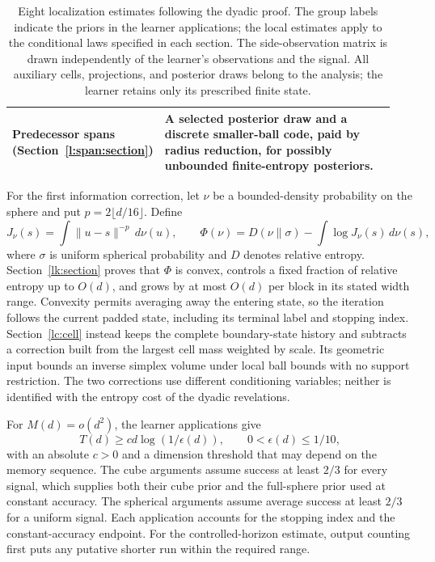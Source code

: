 \begin{table}[!ht]
\begin{tabular}{@{}p{0.28\linewidth}p{0.66\linewidth}@{}}
\addlinespace
\raggedright Predecessor spans\newline
(Section~\ref{l:span:section}) &
A selected posterior draw and a discrete smaller-ball code, paid by
radius reduction, for possibly unbounded finite-entropy posteriors. \\
\bottomrule
\end{tabular}
\caption{Eight localization estimates following the dyadic proof.
The group labels indicate the priors in the learner applications;
the local estimates apply to the conditional laws specified in each
section. The side-observation matrix is drawn independently of the
learner's observations and the signal. All auxiliary cells,
projections, and posterior draws belong to the analysis;
the learner retains only its prescribed finite state.}
\label{l:routes}
\end{table}

For the first information correction, let \(\nu\) be a bounded-density
probability on the sphere and put \(p=2\lfloor d/16\rfloor\). Define
\[
 J_\nu(s)=\int\|u-s\|^{-p}\,d\nu(u),\qquad
 \Phi(\nu)=D(\nu\|\sigma)-\int\log J_\nu(s)\,d\nu(s),
\]
where \(\sigma\) is uniform spherical probability and \(D\) denotes
relative entropy. Section~\ref{lk:section} proves that \(\Phi\) is
convex, controls a fixed fraction of relative entropy up to \(O(d)\),
and grows by at most \(O(d)\) per block in its stated width range.
Convexity permits averaging away the entering state, so the iteration
follows the current padded state, including its terminal label and
stopping index. Section~\ref{lc:cell} instead keeps the complete
boundary-state history and subtracts a correction built from the
largest cell mass weighted by scale. Its geometric input bounds an
inverse simplex volume under local ball bounds with no support
restriction. The two corrections use different conditioning variables;
neither is identified with the entropy cost of the dyadic revelations.

For \(M(d)=o(d^2)\), the learner applications give
\[
 T(d)\ge c d\log(1/\epsilon(d)),\qquad
 0<\epsilon(d)\le1/10,
\]
with an absolute \(c>0\) and a dimension threshold that may depend
on the memory sequence. The cube arguments assume success at least
\(2/3\) for every signal, which supplies both their cube prior and
the full-sphere prior used at constant accuracy. The spherical
arguments assume average success at least \(2/3\) for a uniform
signal. Each application accounts for the stopping index and the
constant-accuracy endpoint. For the controlled-horizon estimate,
output counting first puts any putative shorter run within the
required range.

